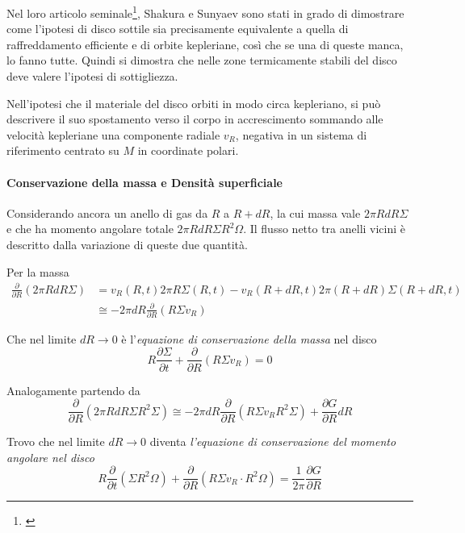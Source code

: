 \documentclass[a4paperbi]{article}
\begin{document}
	Nel loro articolo seminale\footnote{\cite{ShakuraSunyaev1973}}, Shakura e Sunyaev sono stati in grado di dimostrare come l'ipotesi di disco sottile sia precisamente equivalente a quella di raffreddamento efficiente e di orbite kepleriane, così che se una di queste manca, lo fanno tutte. Quindi si dimostra che nelle zone termicamente stabili del disco deve valere l'ipotesi di sottigliezza.
	
	Nell'ipotesi che il materiale del disco orbiti in modo circa kepleriano, si può descrivere il suo spostamento verso il corpo in accrescimento sommando alle velocità kepleriane una componente radiale $v_R$, negativa in un sistema di riferimento centrato su $M$ in coordinate polari.
	
	\paragraph{Conservazione della massa e Densità superficiale}
	Considerando ancora un anello di gas da $R$ a $R+dR$, la cui massa vale $2\pi RdR\Sigma$ e che ha momento angolare totale $2\pi RdR\Sigma R^2\Omega$. Il flusso netto tra anelli vicini è descritto dalla variazione di queste due quantità. 
	
	Per la massa
	\begin{align*}
		\frac{\partial}{\partial R}(2\pi RdR\Sigma)&=v_R(R,t)2\pi R\Sigma(R,t)-v_R(R+dR,t)2\pi(R+dR)\Sigma(R+dR,t)\\
		&\cong-2\pi dR\frac{\partial}{\partial R}(R\Sigma v_R)
	\end{align*}
	
	Che nel limite $dR\rightarrow 0$ è l'\textit{equazione di conservazione della massa} nel disco
	\begin{equation}
		R\frac{\partial\Sigma}{\partial t}+\frac{\partial}{\partial R}(R\Sigma v_R)=0
	\end{equation}
	
	Analogamente partendo da
	\begin{equation*}
		\frac{\partial}{\partial R}(2\pi RdR\Sigma R^2\Sigma)\cong-2\pi dR\frac{\partial}{\partial R}(R\Sigma v_R R^2\Sigma)+\frac{\partial G}{\partial R}dR	
	\end{equation*}
	
	Trovo che nel limite $dR\rightarrow 0$ diventa \textit{l'equazione di conservazione del momento angolare nel disco}
	\begin{equation}
		R\frac{\partial}{\partial t}(\Sigma R^2\Omega)+\frac{\partial}{\partial R}(R\Sigma v_R\cdot R^2\Omega)=\frac{1}{2\pi}\frac{\partial G}{\partial R}
	\end{equation}
	
\end{document}

